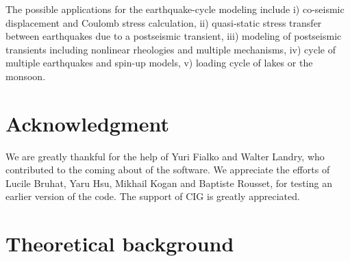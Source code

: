 \documentclass[10pt]{article}
\begin{document}
The possible applications for the earthquake-cycle modeling include i) co-seismic displacement and Coulomb stress calculation, ii) quasi-static stress transfer between earthquakes due to a postseismic transient, iii) modeling of postseismic transients including nonlinear rheologies and multiple mechanisms, iv) cycle of multiple earthquakes and spin-up models, v) loading cycle of lakes or the monsoon.

\section{Acknowledgment}
We are greatly thankful for the help of Yuri Fialko and Walter Landry, who contributed to the coming about of the software. We appreciate the efforts of Lucile Bruhat, Yaru Hsu, Mikhail Kogan and Baptiste Rousset, for testing an earlier version of the code. The support of CIG is greatly appreciated.


\vspace{2.5cm}
\let\thefootnote\relax{}


\pagebreak

\tableofcontents

\pagebreak

\section{Theoretical background}
\end{document}
